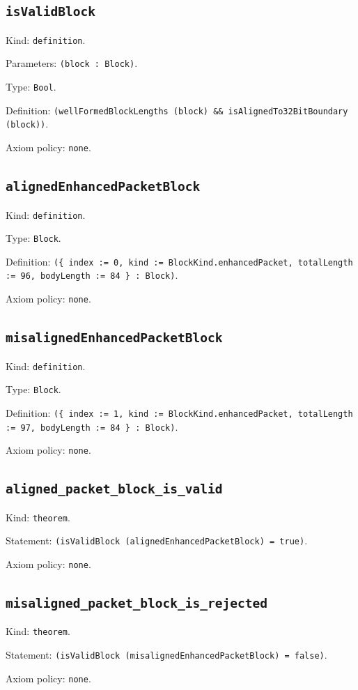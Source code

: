 \documentclass[11pt]{article}
\begin{document}
\subsection*{\texttt{isValidBlock}}
\noindent Kind: \texttt{definition}.\par
\noindent Parameters: \texttt{(block : Block)}.\par
\noindent Type: \texttt{Bool}.\par
\noindent Definition: \texttt{(wellFormedBlockLengths (block) \&\& isAlignedTo32BitBoundary (block))}.\par
\noindent Axiom policy: \texttt{none}.\par
\subsection*{\texttt{alignedEnhancedPacketBlock}}
\noindent Kind: \texttt{definition}.\par
\noindent Type: \texttt{Block}.\par
\noindent Definition: \texttt{(\{ index := 0, kind := BlockKind.enhancedPacket, totalLength := 96, bodyLength := 84 \} : Block)}.\par
\noindent Axiom policy: \texttt{none}.\par
\subsection*{\texttt{misalignedEnhancedPacketBlock}}
\noindent Kind: \texttt{definition}.\par
\noindent Type: \texttt{Block}.\par
\noindent Definition: \texttt{(\{ index := 1, kind := BlockKind.enhancedPacket, totalLength := 97, bodyLength := 84 \} : Block)}.\par
\noindent Axiom policy: \texttt{none}.\par
\subsection*{\texttt{aligned\_packet\_block\_is\_valid}}
\noindent Kind: \texttt{theorem}.\par
\noindent Statement: \texttt{(isValidBlock (alignedEnhancedPacketBlock) = true)}.\par
\noindent Axiom policy: \texttt{none}.\par
\subsection*{\texttt{misaligned\_packet\_block\_is\_rejected}}
\noindent Kind: \texttt{theorem}.\par
\noindent Statement: \texttt{(isValidBlock (misalignedEnhancedPacketBlock) = false)}.\par
\noindent Axiom policy: \texttt{none}.\par
\end{document}
